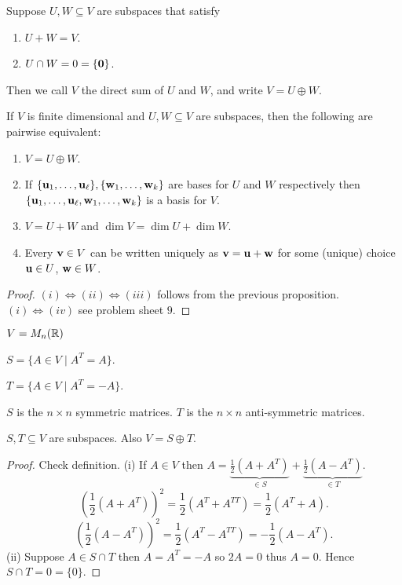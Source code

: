 \documentclass[10pt, a4paper]{article}
\begin{document}
\begin{definition}
    Suppose $U, W \subseteq V$ are subspaces that satisfy
    \begin{enumerate}[label = (\roman*)]
        \item $U + W = V$.
        \item $U \cap W = 0 = \{\mathbf{0}\}$.
    \end{enumerate}
    Then we call $V$ the direct sum of $U$ and $W$,
    and write $V = U \oplus W$.
\end{definition}

\begin{proposition}
    If $V$ is finite dimensional and $U, W \subseteq V$ are subspaces,
    then the following are pairwise equivalent:
    \begin{enumerate}[label = (\roman*)]
        \item $V = U \oplus W$.
        \item If $\{\mathbf{u}_1, \dotsc, \mathbf{u}_{\ell}\}, \{\mathbf{w}_1, \dotsc, \mathbf{w}_k\}$ are bases for $U$ and $W$ respectively then $\{\mathbf{u}_1, \dotsc, \mathbf{u}_{\ell}, \mathbf{w}_1, \dotsc, \mathbf{w}_k\}$ is a basis for $V$.
        \item $V = U + W$ and $\dim{V} = \dim{U} + \dim{W}$.
        \item Every $\mathbf{v} \in V$ can be written uniquely as $\mathbf{v} = \mathbf{u} + \mathbf{w}$ for some
        (unique)
        choice $\mathbf{u} \in U$,
        $\mathbf{w} \in W$.
    \end{enumerate}
    \begin{proof}
        $(i) \iff (ii) \iff (iii)$ follows from the previous proposition.
        $(i) \iff (iv)$ see problem sheet $9$.
    \end{proof}
\end{proposition}

\begin{example}
    $V = M_n(\mathbb{R})$
    
    $S = \{A \in V \mid A ^ T = A\}$.

    $T = \{A \in V \mid A ^ T = -A\}$.

    $S$ is the $n \times n$ symmetric matrices.
    $T$ is the $n \times n$ anti-symmetric matrices.

    $S, T \subseteq V$ are subspaces.
    Also $V = S \oplus T$.
    \begin{proof}
        Check definition.
        (i)
        If $A \in V$ then $A = \underbrace{\frac{1}{2}(A + A ^ T)}_{\in S} + \underbrace{\frac{1}{2}(A - A ^ T)}_{\in T}$.
        \[
        \left(\frac{1}{2}(A + A ^ T)\right) ^ 2 = \frac{1}{2}(A ^ T + A ^ {TT}) = \frac{1}{2}(A ^ T + A).
        \]
        \[
        \left(\frac{1}{2}(A - A ^ T)\right) ^ 2 = \frac{1}{2}(A ^ T - A ^ {TT}) = -\frac{1}{2}(A - A ^ T).
        \]
        (ii)
        Suppose $A \in S \cap T$ then $A = A ^ T = -A$ so $2A = 0$ thus $A = 0$.
        Hence $S \cap T = 0 = \{0\}$.
    \end{proof}
\end{example}
\end{document}
